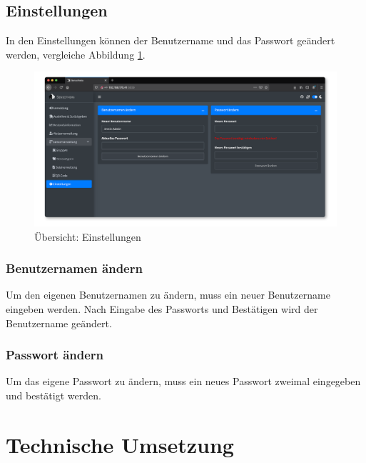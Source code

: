 \documentclass[
]{article}
\begin{document}
\hypertarget{settings}{%
\subsection{Einstellungen}\label{settings}}

In den Einstellungen können der Benutzername und das Passwort geändert werden, vergleiche Abbildung \ref{fig:settings-overview}.

\begin{figure}
\centering
\includegraphics{./img/settings_overview.png}
\caption{\label{fig:settings-overview}Übersicht: Einstellungen}
\end{figure}

\hypertarget{benutzernamen-uxe4ndern}{%
\subsubsection{Benutzernamen ändern}\label{benutzernamen-uxe4ndern}}

Um den eigenen Benutzernamen zu ändern, muss ein neuer Benutzername eingeben werden. Nach Eingabe des Passworts und Bestätigen wird der Benutzername geändert.

\hypertarget{passwort-uxe4ndern}{%
\subsubsection{Passwort ändern}\label{passwort-uxe4ndern}}

Um das eigene Passwort zu ändern, muss ein neues Passwort zweimal eingegeben und bestätigt werden.

\hypertarget{technical-guide}{%
\section{Technische Umsetzung}\label{technical-guide}}
\end{document}
